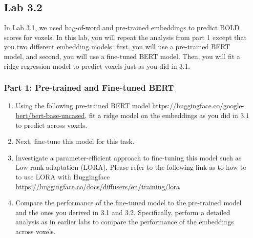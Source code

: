 \documentclass[letterpaper,12pt]{article}
\begin{document}
\clearpage
\subsection{Lab 3.2}
In Lab 3.1, we used bag-of-word and pre-trained embeddings to predict BOLD scores for voxels. In this lab, you will repeat the analysis from part 1 except that you two different embedding models: first, you will use a pre-trained BERT model, and second, you will use a fine-tuned BERT model. Then, you will fit a ridge regression model to predict voxels just as you did in 3.1.



\subsubsection{Part 1: Pre-trained and Fine-tuned BERT}

\begin{enumerate}
    \item Using the following pre-trained BERT model \href{https://huggingface.co/google-bert/bert-base-uncased}{https://huggingface.co/google-bert/bert-base-uncased}, fit a ridge model on the embeddings as you did in 3.1 to predict across voxels.
    \item Next, fine-tune this model for this task.
    \item Investigate a parameter-efficient approach to fine-tuning this model such as Low-rank adaptation (LORA). Please refer to the following link as to how to to use LORA with Huggingface \href{https://huggingface.co/docs/diffusers/en/training/lora}{https://huggingface.co/docs/diffusers/en/training/lora}
    \item Compare the performance of the fine-tuned model to the pre-trained model and the ones you derived in 3.1 and 3.2. Specifically, perform a detailed analysis as in earlier labs to compare the performance of the embeddings across voxels.
\end{enumerate}
\end{document}
